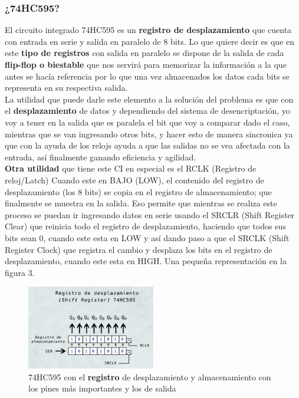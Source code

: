 \documentclass{article}
\begin{document}
\subsubsection*{¿74HC595?}
El circuito integrado 74HC595 es un \textbf{registro de desplazamiento} \cite{74HC595Informacion}  que cuenta con entrada en serie y salida en paralelo de 8 bits. Lo que quiere decir es que en este \textbf{tipo de registros} \cite{tipo_de_registros} con salida en paralelo se dispone de la salida de cada \textbf{flip-flop o biestable} \cite{flip-flop_o_biestable} que nos servirá para memorizar la información a la que antes se hacía referencia por lo que una vez almacenados los datos cada bits se representa en su respectiva salida.
\\[0.2cm]
La utilidad que puede darle este elemento a la solución
del problema es que con el \textbf{desplazamiento} \cite{74hc595_como_funciona} de datos y dependiendo del sistema de desencriptación, yo voy a tener en la salida que es paralela el bit que voy a comparar dado el caso, mientras que se van ingresando otros bits, y hacer esto de manera sincronica ya que con la ayuda de los relojs ayuda a que las salidas no se vea afectada con la entrada, así finalmente ganando eficiencia y agilidad.
\\[0.2cm]
\textbf{Otra utilidad} \cite{registro_desplazamiento_almacenamiento} que tiene este CI en especial es el RCLK (Registro de reloj/Latch) Cuando este en BAJO (LOW), el contenido del registro de desplazamiento (los 8 bits) se copia en el registro de almacenamiento; que finalmente se muestra en la salida. Eso permite que mientras se realiza este proceso se puedan ir ingresando datos en serie usando el SRCLR (Shift Register Clear) que reinicia todo el registro de desplazamiento, haciendo que todos sus bits sean 0, cuando este esta en LOW y así dando paso a que el SRCLK (Shift Register Clock) que registra el cambio y desplaza los bits en el registro de desplazamiento, cuando este esta en HIGH. Una pequeña representación en la figura 3.

\begin{figure}[!ht]
\caption{74HC595 con el \textbf{registro} \cite{registro_desplazamiento_almacenamiento} de desplazamiento y almacenamiento con los pines más importantes y los de salida}
\centering
\includegraphics[width=0.5\textwidth]{registro_desplazamiento_pines.png}
\end{figure}
\end{document}
